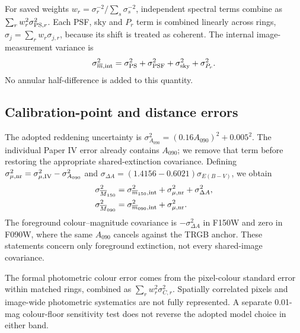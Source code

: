 \documentclass[nodoi,nocopyright]{pas}
\newcommand{\mbar}{\overline{m}}
\newcommand{\Mbar}{\overline{M}}
\begin{document}
For saved weights $w_r=\sigma_r^{-2}/\sum_s\sigma_s^{-2}$, independent
spectral terms combine as $\sum_r w_r^2\sigma_{{\rm PS},r}^2$.
Each PSF, sky and $P_r$ term is combined linearly across rings,
$\sigma_j=\sum_r w_r\sigma_{j,r}$, because its shift is treated as coherent.
The internal image-measurement variance is
\begin{equation}
 \sigma_{\mbar,\rm int}^2
 =\sigma_{\rm PS}^2+\sigma_{\rm PSF}^2+
  \sigma_{\rm sky}^2+\sigma_{P_r}^2.
 \label{eq:measurement-error}
\end{equation}
No annular half-difference is added to this quantity.

\subsection{Calibration-point and distance errors}

The adopted reddening uncertainty is
$\sigma_{A_{090}}^2=(0.16A_{090})^2+0.005^2$.
The individual Paper IV error already contains $A_{090}$; we remove that
term before restoring the appropriate shared-extinction covariance.
Defining $\sigma_{\mu,\rm nr}^2=\sigma_{\mu,\rm IV}^2-\sigma_{A_{090}}^2$
and $\sigma_{\Delta A}=(1.4156-0.6021)\sigma_{E(B-V)}$, we obtain
\begin{align}
 \sigma_{\Mbar_{150}}^2
 &=\sigma_{\mbar_{150},\rm int}^2+\sigma_{\mu,\rm nr}^2+\sigma_{\Delta A}^2,
 \\
 \sigma_{\Mbar_{090}}^2
 &=\sigma_{\mbar_{090},\rm int}^2+\sigma_{\mu,\rm nr}^2.
 \label{eq:point-errors}
\end{align}
The foreground colour--magnitude covariance is
$-\sigma_{\Delta A}^2$ in F150W and zero in F090W, where the same
$A_{090}$ cancels against the TRGB anchor. These statements concern only
foreground extinction, not every shared-image covariance.

The formal photometric colour error comes from the pixel-colour standard
error within matched rings, combined as $\sum_r w_r^2\sigma_{C,r}^2$.
Spatially correlated pixels and image-wide photometric systematics are
not fully represented. A separate 0.01-mag colour-floor sensitivity test
does not reverse the adopted model choice in either band.
\end{document}
